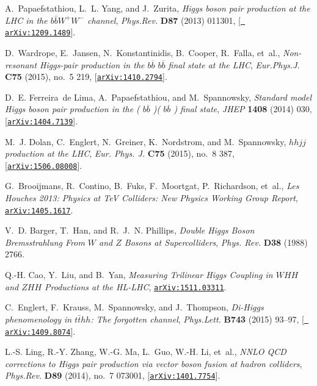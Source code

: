 \documentclass[a4paper,11pt]{article}
\begin{document}
\begin{thebibliography}{100}
A.~Papaefstathiou, L.~L. Yang, and J.~Zurita, {\it {Higgs boson pair production
  at the LHC in the $b \bar{b} W^+ W^-$ channel}},  {\em Phys.Rev.} {\bf D87}
  (2013) 011301, [\href{http://arxiv.org/abs/1209.1489}{{\tt
  arXiv:1209.1489}}].

D.~Wardrope, E.~Jansen, N.~Konstantinidis, B.~Cooper, R.~Falla, et~al., {\it
  {Non-resonant Higgs-pair production in the $b\overline{b}$ $b\overline{b}$
  final state at the LHC}},  {\em Eur.Phys.J.} {\bf C75} (2015), no.~5 219,
  [\href{http://arxiv.org/abs/1410.2794}{{\tt arXiv:1410.2794}}].

D.~E. Ferreira~de Lima, A.~Papaefstathiou, and M.~Spannowsky, {\it {Standard
  model Higgs boson pair production in the ( $ b\overline{b} $ )( $
  b\overline{b} $ ) final state}},  {\em JHEP} {\bf 1408} (2014) 030,
  [\href{http://arxiv.org/abs/1404.7139}{{\tt arXiv:1404.7139}}].

M.~J. Dolan, C.~Englert, N.~Greiner, K.~Nordstrom, and M.~Spannowsky, {\it
  {$hhjj$ production at the LHC}},  {\em Eur. Phys. J.} {\bf C75} (2015), no.~8
  387, [\href{http://arxiv.org/abs/1506.08008}{{\tt arXiv:1506.08008}}].

G.~Brooijmans, R.~Contino, B.~Fuks, F.~Moortgat, P.~Richardson, et~al., {\it
  {Les Houches 2013: Physics at TeV Colliders: New Physics Working Group
  Report}},  \href{http://arxiv.org/abs/1405.1617}{{\tt arXiv:1405.1617}}.

V.~D. Barger, T.~Han, and R.~J.~N. Phillips, {\it {Double Higgs Boson
  Bremsstrahlung From $W$ and $Z$ Bosons at Supercolliders}},  {\em Phys. Rev.}
  {\bf D38} (1988) 2766.

Q.-H. Cao, Y.~Liu, and B.~Yan, {\it {Measuring Trilinear Higgs Coupling in
  $WHH$ and $ZHH$ Productions at the HL-LHC}},
  \href{http://arxiv.org/abs/1511.03311}{{\tt arXiv:1511.03311}}.

C.~Englert, F.~Krauss, M.~Spannowsky, and J.~Thompson, {\it {Di-Higgs
  phenomenology in $t\bar{t}hh$: The forgotten channel}},  {\em Phys.Lett.}
  {\bf B743} (2015) 93--97, [\href{http://arxiv.org/abs/1409.8074}{{\tt
  arXiv:1409.8074}}].

L.-S. Ling, R.-Y. Zhang, W.-G. Ma, L.~Guo, W.-H. Li, et~al., {\it {NNLO QCD
  corrections to Higgs pair production via vector boson fusion at hadron
  colliders}},  {\em Phys.Rev.} {\bf D89} (2014), no.~7 073001,
  [\href{http://arxiv.org/abs/1401.7754}{{\tt arXiv:1401.7754}}].


\end{thebibliography}
\end{document}
